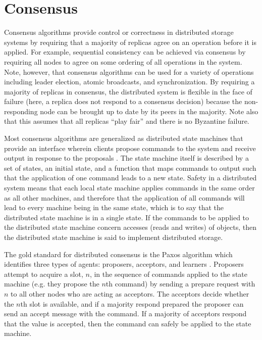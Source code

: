 \documentclass[letterpaper,twocolumn,10pt]{article}
\begin{document}
\section{Consensus}


Consensus algorithms provide control or correctness in distributed storage systems by requiring that a majority of replicas agree on an operation before it is applied. For example, sequential consistency can be achieved via consensus by requiring all nodes to agree on some ordering of all operations in the system. Note, however, that consensus algorithms can be used for a variety of operations including leader election, atomic broadcasts, and synchronization. By requiring a majority of replicas in consensus, the distributed system is flexible in the face of failure (here, a replica does not respond to a consensus decision) because the non-responding node can be brought up to date by its peers in the majority. Note also that this assumes that all replicas ``play fair'' and there is no Byzantine failure.

Most consensus algorithms are generalized as distributed state machines that provide an interface wherein clients propose commands to the system and receive output in response to the proposals \cite{lampson_how_1996-1, lamport_reconfiguring_2010}. The state machine itself is described by a set of states, an initial state, and a function that maps commands to output such that the application of one command leads to a new state. Safety in a distributed system means that each local state machine applies commands in the same order as all other machines, and therefore that the application of all commands will lead to every machine being in the same state, which is to say that the distributed state machine is in a single state. If the commands to be applied to the distributed state machine concern accesses (reads and writes) of objects, then the distributed state machine is said to implement distributed storage.

The gold standard for distributed consensus is the Paxos algorithm which identifies three types of agents: proposers, acceptors, and learners \cite{lamport_paxos_2001}. Proposers attempt to acquire a slot, $n$, in the sequence of commands applied to the state machine (e.g. they propose the $n$th command) by sending a prepare request with $n$ to all other nodes who are acting as acceptors. The acceptors decide whether the $n$th slot is available, and if a majority respond prepared the proposer can send an accept message with the command. If a majority of acceptors respond that the value is accepted, then the command can safely be applied to the state machine.
\end{document}
